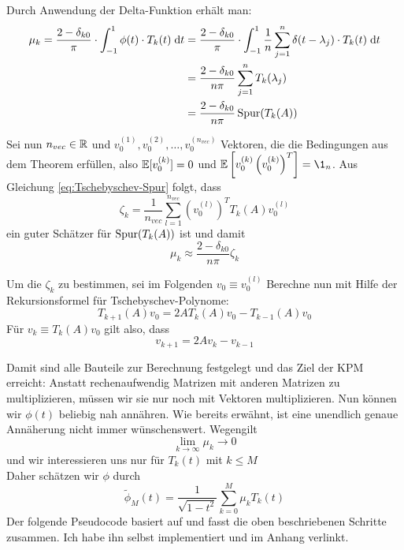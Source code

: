 Durch Anwendung der Delta-Funktion erhält man:
\begin{align*}
    \mu_k = \frac{2 - \delta_{k0}}{\pi} \cdot \int_{-1}^1 \phi(t) \cdot T_k(t) \;\mathrm{d}t &= \frac{2 - \delta_{k0}}{\pi} \cdot \int_{-1}^1 \frac{1}{n} \sum_{j = 1}^n \delta(t - \lambda_j) \cdot T_k(t) \;\mathrm{d}t \\
    &= \frac{2 - \delta_{k0}}{n \pi} \sum_{j = 1}^n T_k(\lambda_j)\\
    &= \frac{2 - \delta_{k0}}{n \pi} \operatorname{Spur}(T_k(A))
\end{align*}

Sei nun $n_{vec} \in \mathbb{R}$ und $v_0^{(1)}, v_0^{(2)}, \dots, v_0^{(n_{vec})}$ Vektoren, die die Bedingungen aus dem Theorem erfüllen,
also $\mathbb{E}[v_0^{(k)}] = 0$ und $\E\left[v_0^{(k)}\left(v_0^{(k)}\right)^T\right] = \1_n$.
Aus Gleichung \ref{eq:Tschebyschev-Spur} folgt, dass
$$\zeta_k = \frac{1}{n_{vec}} \sum_{l = 1}^{n_{vec}} \left( v_0^{(l)} \right)^T T_k(A) v_0^{(l)}$$
ein guter Schätzer für $\operatorname{Spur}(T_k(A))$ ist und damit
$$\mu_k \approx \frac{2 - \delta_{k0}}{n \pi} \zeta_k$$

Um die $\zeta_k$ zu bestimmen, sei im Folgenden $v_0 \equiv v_0^{(l)}$
Berechne nun mit Hilfe der Rekursionsformel für Tschebyschev-Polynome:
$$T_{k + 1}(A)v_0 = 2 A T_k(A) v_0 - T_{k - 1}(A) v_0$$
Für $v_k \equiv T_k(A)v_0$ gilt also, dass
$$v_{k + 1} = 2 A v_k - v_{k - 1}$$

Damit sind alle Bauteile zur Berechnung festgelegt und das Ziel der KPM erreicht:
Anstatt rechenaufwendig Matrizen mit anderen Matrizen zu multiplizieren, müssen wir sie nur noch mit Vektoren multiplizieren.
Nun können wir $\phi(t)$ beliebig nah annähren.
Wie bereits erwähnt, ist eine unendlich genaue Annäherung nicht immer wünschenswert.
Wegengilt
$$\lim \limits_{k \to \infty} \mu_k \to 0$$
und wir interessieren uns nur für $T_k(t)$ mit $k \leq M$\\
Daher schätzen wir $\phi$ durch
\begin{equation} \label{eq:Angenäherte Spektraldichte}
    \tilde{\phi}_M(t) = \frac{1}{\sqrt{1 - t^2}} \sum_{k = 0}^{M} \mu_k T_k(t)
\end{equation}
\newline
Der folgende Pseudocode basiert auf \cite[p.~10]{linsaadyang14} und fasst die oben beschriebenen Schritte zusammen.
Ich habe ihn selbst implementiert und im Anhang verlinkt.

